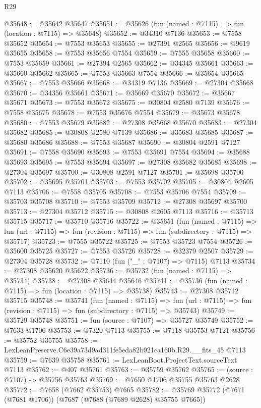 \begin{lexlean}{R29}
\begin{coremodule}
@35648 := @35642 @35647
@35651 := @35626 (fun (named : @7115) => fun (location : @7115) => @35648)
@35652 := @34310 @7136
@35653 := @7558 @35652
@35654 := @7553 @35653
@35655 := @27391 @2565
@35656 := @9619 @35655
@35658 := @7553 @35656 @7554
@35659 := @7555 @35658
@35660 := @7553 @35659
@35661 := @27394 @2565
@35662 := @34345 @35661
@35663 := @35660 @35662
@35665 := @7553 @35663 @7554
@35666 := @35654 @35665
@35667 := @7553 @35666
@35668 := @34319 @7136
@35669 := @27304 @35668
@35670 := @34356 @35661
@35671 := @35669 @35670
@35672 := @35667 @35671
@35673 := @7553 @35672
@35675 := @30804 @2580 @7139
@35676 := @7558 @35675
@35678 := @7553 @35676 @7554
@35679 := @35673 @35678
@35680 := @7553 @35679
@35682 := @27308 @35668 @35670
@35683 := @27304 @35682
@35685 := @30808 @2580 @7139
@35686 := @35683 @35685
@35687 := @35680 @35686
@35688 := @7553 @35687
@35690 := @30804 @2591 @7127
@35691 := @7558 @35690
@35693 := @7553 @35691 @7554
@35694 := @35688 @35693
@35695 := @7553 @35694
@35697 := @27308 @35682 @35685
@35698 := @27304 @35697
@35700 := @30808 @2591 @7127
@35701 := @35698 @35700
@35702 := @35695 @35701
@35703 := @7553 @35702
@35705 := @30804 @2605 @7113
@35706 := @7558 @35705
@35708 := @7553 @35706 @7554
@35709 := @35703 @35708
@35710 := @7553 @35709
@35712 := @27308 @35697 @35700
@35713 := @27304 @35712
@35715 := @30808 @2605 @7113
@35716 := @35713 @35715
@35717 := @35710 @35716
@35722 := @35651
    (fun (named : @7115) =>
    fun (url : @7115) => fun (revision : @7115) => fun (subdirectory : @7115) => @35717)
@35723 := @7555 @35722
@35725 := @7553 @35723 @7554
@35726 := @35600 @35725
@35727 := @7553 @35726
@35728 := @32379 @2507
@35729 := @27304 @35728
@35732 := @7110 (fun ("_" : @7107) => @7115) @7113
@35734 := @27308 @35620 @35622
@35736 := @35732 (fun (named : @7115) => @35734)
@35738 := @27308 @35644 @35646
@35741 := @35736 (fun (named : @7115) => fun (location : @7115) => @35738)
@35743 := @27308 @35712 @35715
@35748 := @35741
    (fun (named : @7115) =>
    fun (url : @7115) => fun (revision : @7115) => fun (subdirectory : @7115) => @35743)
@35749 := @35729 @35748
@35751 := fun (source : @7107) => @35727 @35749
@35752 := @7633 @1706
@35753 := @7320 @7113
@35755 := @7118 @35753 @7121
@35756 := @35752 @35755
@35758 := LexLeanPreserve.C6e39a73d9ad311fe5eda82b921ca160b.R29.__fits_45 @7113
@35759 := @7639 @35758
@35761 := LexLeanBoot.ProjectText.sourceText @7113
@35762 := @407 @35761
@35763 := @35759 @35762
@35765 := (source : @7107) -> @35756 @35763
@35769 := @7650 @1706 @35755 @35763 @2628
@35772 := @7658 (@7662 @35753) @7665
@35782 := @35769 @35772 (@7671 (@7681 @1706)) (@7687 (@7688 (@7689 @2628) @35755 @7665))

\end{coremodule}
\end{lexlean}
